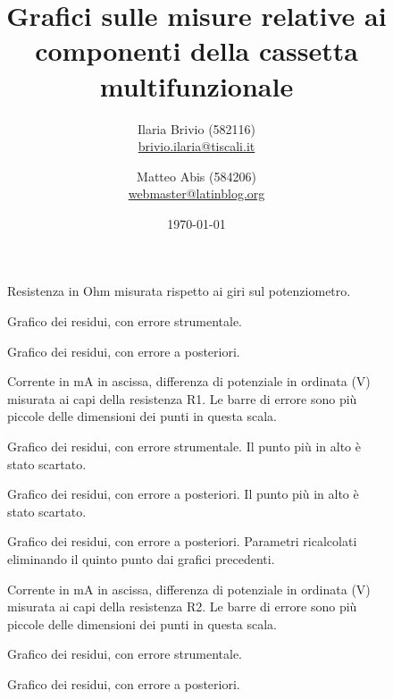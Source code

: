 \documentclass[italian,a4paper]{article}
\begin{document}
\title{Grafici sulle misure relative ai componenti della cassetta multifunzionale}
\author{\normalsize Ilaria Brivio (582116)\\%
\normalsize \url{brivio.ilaria@tiscali.it}%
\and %
\normalsize Matteo Abis (584206)\\ %
\normalsize \url{webmaster@latinblog.org}}
\date{\today}
\maketitle
\begin{figure}[p]\caption{Resistenza in Ohm misurata rispetto ai giri sul potenziometro.}
\centering

\end{figure}
\begin{figure}[p]\caption{Grafico dei residui, con errore strumentale.}
\centering

\end{figure}
\begin{figure}[p]\caption{Grafico dei residui, con errore a posteriori.}
\centering

\end{figure}
\begin{figure}[p]\caption{Corrente in mA in ascissa, differenza di potenziale in ordinata (V) misurata ai capi della resistenza R1. Le barre di errore sono più piccole delle dimensioni dei punti in questa scala.}
\centering

\end{figure}
\begin{figure}[p]\caption{Grafico dei residui, con errore strumentale. Il punto più in alto è stato scartato.}
\centering

\end{figure}
\begin{figure}[p]\caption{Grafico dei residui, con errore a posteriori.  Il punto più in alto è stato scartato.}
\centering

\end{figure}
\begin{figure}[p]\caption{Grafico dei residui, con errore a posteriori. Parametri ricalcolati eliminando il quinto punto dai grafici precedenti.}
\centering

\end{figure}
\begin{figure}[p]\caption{Corrente in mA in ascissa, differenza di potenziale in ordinata (V) misurata ai capi della resistenza R2. Le barre di errore sono più piccole delle dimensioni dei punti in questa scala.}
\centering

\end{figure}
\begin{figure}[p]\caption{Grafico dei residui, con errore strumentale.}
\centering

\end{figure}
\begin{figure}[p]\caption{Grafico dei residui, con errore a posteriori.}
\centering

\end{figure}
\end{document}
